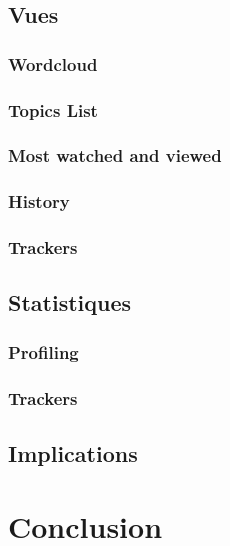 	\subsection{Vues}

		\subsubsection{Wordcloud}

		\subsubsection{Topics List}

		\subsubsection{Most watched and viewed}

		\subsubsection{History}

		\subsubsection{Trackers}

	\subsection{Statistiques}

		\subsubsection{Profiling}

		\subsubsection{Trackers}

	\subsection{Implications}

\section{Conclusion}